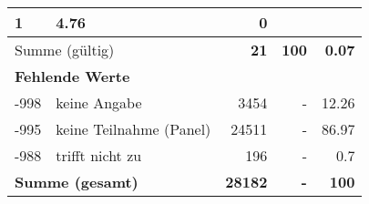 \begin{longtable}{lXrrr}
       \num{1} &
       \num[round-mode=places,round-precision=2]{4.76} &
         \num[round-mode=places,round-precision=2]{0} \\
     \midrule
     \multicolumn{2}{l}{Summe (gültig)} &
       \textbf{\num{21}} &
     \textbf{\num{100}} &
       \textbf{\num[round-mode=places,round-precision=2]{0.07}} \\
     \multicolumn{5}{l}{\textbf{Fehlende Werte}}\\
       -998 &
       keine Angabe &
         \num{3454} &
        - &
         \num[round-mode=places,round-precision=2]{12.26} \\
       -995 &
       keine Teilnahme (Panel) &
         \num{24511} &
        - &
         \num[round-mode=places,round-precision=2]{86.97} \\
       -988 &
       trifft nicht zu &
         \num{196} &
        - &
         \num[round-mode=places,round-precision=2]{0.7} \\
     \midrule
     \multicolumn{2}{l}{\textbf{Summe (gesamt)}} &
          \textbf{\num{28182}} &
        \textbf{-} &
        \textbf{\num{100}} \\
     \bottomrule
     \end{longtable}
     
